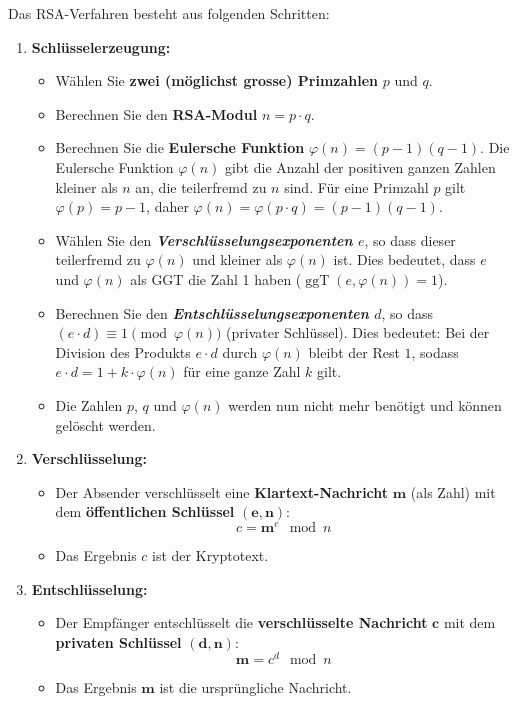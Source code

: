 \begin{myprocedure}\label{myprocedure:RSA}
	Das \gls{RSA}-Verfahren besteht aus folgenden Schritten:
\begin{enumerate}
	\item \textbf{Schlüsselerzeugung:}
	      \begin{itemize}
		      \item Wählen Sie \textbf{zwei (möglichst grosse) Primzahlen} \( p \) und \( q \).
		      \item Berechnen Sie den \textbf{\gls{RSA}-Modul} \( n = p \cdot q \).
		      \item Berechnen Sie die \textbf{Eulersche Funktion} \( \varphi(n) = (p-1)(q-1) \). Die Eulersche Funktion \( \varphi(n) \) gibt die Anzahl der positiven ganzen Zahlen kleiner als \( n \) an, die teilerfremd zu \( n \) sind. Für eine Primzahl $p$ gilt \( \varphi(p) = p-1 \), daher \( \varphi(n) = \varphi(p \cdot q) = (p-1)(q-1) \).
		      \item Wählen Sie den \textbf{\emph{Verschlüsselungsexponenten} \( e \)}, so dass dieser teilerfremd zu \( \varphi(n) \) und kleiner als $\varphi(n)$ ist. Dies bedeutet, dass $e$ und $\varphi(n)$ als \gls{GGT} die Zahl 1 haben ($\operatorname{ggT}(e, \varphi(n)) = 1$).
		      \item Berechnen Sie den \textbf{\emph{Entschlüsselungsexponenten} \( d \)}, so dass \( (e \cdot d) \equiv 1 \pmod{\varphi(n)} \) (privater Schlüssel). Dies bedeutet: Bei der Division des Produkts $e \cdot d$ durch $\varphi(n)$ bleibt der Rest $1$, sodass $e \cdot d = 1 + k \cdot \varphi(n)$ für eine ganze Zahl $k$ gilt.
		      \item Die Zahlen $p$, $q$ und $\varphi(n)$ werden nun nicht mehr benötigt und können gelöscht werden.
	      \end{itemize}
	\item \textbf{Verschlüsselung:}
	      \begin{itemize}
		      \item Der Absender verschlüsselt eine \textbf{Klartext-Nachricht} \( \mathbf{m} \) (als Zahl) mit dem \textbf{öffentlichen Schlüssel} \( \mathbf{(e, n)} \):
		            \[
			            c = \mathbf{m}^e \mod n
		            \]
		      \item Das Ergebnis \( c \) ist der Kryptotext.
	      \end{itemize}
	\item \textbf{Entschlüsselung:}
	      \begin{itemize}
		      \item Der Empfänger entschlüsselt die \textbf{verschlüsselte Nachricht} \( \mathbf{c} \) mit dem \textbf{privaten Schlüssel} \( \mathbf{(d, n)} \):
		            \[
			            \mathbf{m} = c^d \mod n
		            \]
		      \item Das Ergebnis \( \mathbf{m} \) ist die ursprüngliche Nachricht.
	      \end{itemize}
\end{enumerate}
\end{myprocedure}


